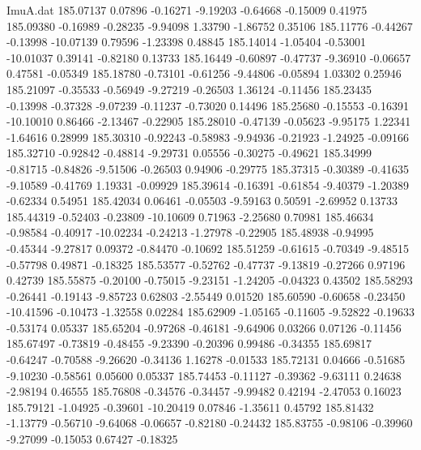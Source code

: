 \begin{filecontents}{ImuA.dat}
 185.07137    0.07896   -0.16271   -9.19203   -0.64668   -0.15009    0.41975
 185.09380   -0.16989   -0.28235   -9.94098    1.33790   -1.86752    0.35106
 185.11776   -0.44267   -0.13998  -10.07139    0.79596   -1.23398    0.48845
 185.14014   -1.05404   -0.53001  -10.01037    0.39141   -0.82180    0.13733
 185.16449   -0.60897   -0.47737   -9.36910   -0.06657    0.47581   -0.05349
 185.18780   -0.73101   -0.61256   -9.44806   -0.05894    1.03302    0.25946
 185.21097   -0.35533   -0.56949   -9.27219   -0.26503    1.36124   -0.11456
 185.23435   -0.13998   -0.37328   -9.07239   -0.11237   -0.73020    0.14496
 185.25680   -0.15553   -0.16391  -10.10010    0.86466   -2.13467   -0.22905
 185.28010   -0.47139   -0.05623   -9.95175    1.22341   -1.64616    0.28999
 185.30310   -0.92243   -0.58983   -9.94936   -0.21923   -1.24925   -0.09166
 185.32710   -0.92842   -0.48814   -9.29731    0.05556   -0.30275   -0.49621
 185.34999   -0.81715   -0.84826   -9.51506   -0.26503    0.94906   -0.29775
 185.37315   -0.30389   -0.41635   -9.10589   -0.41769    1.19331   -0.09929
 185.39614   -0.16391   -0.61854   -9.40379   -1.20389   -0.62334    0.54951
 185.42034    0.06461   -0.05503   -9.59163    0.50591   -2.69952    0.13733
 185.44319   -0.52403   -0.23809  -10.10609    0.71963   -2.25680    0.70981
 185.46634   -0.98584   -0.40917  -10.02234   -0.24213   -1.27978   -0.22905
 185.48938   -0.94995   -0.45344   -9.27817    0.09372   -0.84470   -0.10692
 185.51259   -0.61615   -0.70349   -9.48515   -0.57798    0.49871   -0.18325
 185.53577   -0.52762   -0.47737   -9.13819   -0.27266    0.97196    0.42739
 185.55875   -0.20100   -0.75015   -9.23151   -1.24205   -0.04323    0.43502
 185.58293   -0.26441   -0.19143   -9.85723    0.62803   -2.55449    0.01520
 185.60590   -0.60658   -0.23450  -10.41596   -0.10473   -1.32558    0.02284
 185.62909   -1.05165   -0.11605   -9.52822   -0.19633   -0.53174    0.05337
 185.65204   -0.97268   -0.46181   -9.64906    0.03266    0.07126   -0.11456
 185.67497   -0.73819   -0.48455   -9.23390   -0.20396    0.99486   -0.34355
 185.69817   -0.64247   -0.70588   -9.26620   -0.34136    1.16278   -0.01533
 185.72131    0.04666   -0.51685   -9.10230   -0.58561    0.05600    0.05337
 185.74453   -0.11127   -0.39362   -9.63111    0.24638   -2.98194    0.46555
 185.76808   -0.34576   -0.34457   -9.99482    0.42194   -2.47053    0.16023
 185.79121   -1.04925   -0.39601  -10.20419    0.07846   -1.35611    0.45792
 185.81432   -1.13779   -0.56710   -9.64068   -0.06657   -0.82180   -0.24432
 185.83755   -0.98106   -0.39960   -9.27099   -0.15053    0.67427   -0.18325

\end{filecontents}
